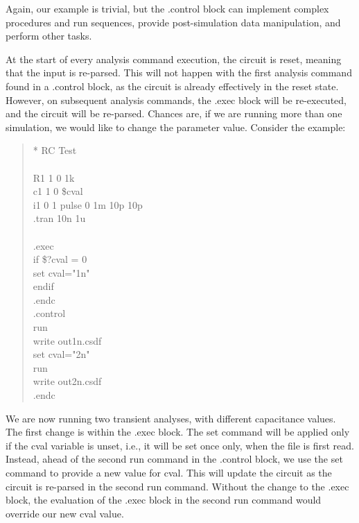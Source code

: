 Again, our example is trivial, but the {\vt .control} block can
implement complex procedures and run sequences, provide
post-simulation data manipulation, and perform other tasks.

At the start of every analysis command execution, the circuit is
reset, meaning that the input is re-parsed.  This will not happen with
the first analysis command found in a {\vt .control} block, as the
circuit is already effectively in the reset state.  However, on
subsequent analysis commands, the {\vt .exec} block will be
re-executed, and the circuit will be re-parsed.  Chances are, if we
are running more than one simulation, we would like to change the
parameter value.  Consider the example:

\begin{quote}\vt
* RC Test\\
\\
R1 1 0 1k\\
c1 1 0 \$cval\\
i1 0 1 pulse 0 1m 10p 10p\\
.tran 10n 1u\\
\\
.exec\\
if \$?cval = 0\\
\hspace*{6mm}set cval="1n"\\
endif\\
.endc\\
.control\\
run\\
write out1n.csdf\\
set cval="2n"\\
run\\
write out2n.csdf\\
.endc
\end{quote}

We are now running two transient analyses, with different capacitance
values.  The first change is within the {\vt .exec} block.  The {\cb
set} command will be applied only if the {\vt cval} variable is unset,
i.e., it will be set once only, when the file is first read.  Instead,
ahead of the second {\cb run} command in the {\vt .control} block, we
use the {\cb set} command to provide a new value for {\vt cval}.  This
will update the circuit as the circuit is re-parsed in the second {\cb
run} command.  Without the change to the {\vt .exec} block, the
evaluation of the {\vt .exec} block in the second {\cb run} command
would override our new {\vt cval} value.

